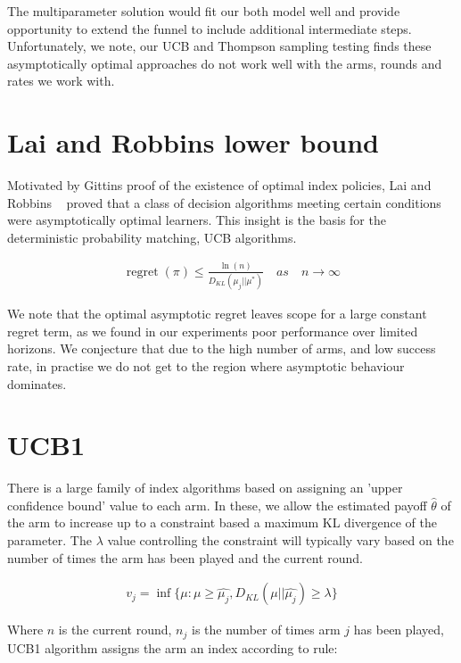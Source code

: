 \documentclass[11pt,a4,singlespacing,titlepagenumber=on]{scrreprt}
\numberwithin{equation}{chapter} %
\theoremstyle{remark}
\begin{document}
The multiparameter solution would fit our both model well and provide opportunity to extend the funnel to include additional intermediate steps. Unfortunately, we note, our UCB and Thompson sampling testing finds these asymptotically optimal approaches do not work well with the arms, rounds and rates we work with.

\section{ Lai and Robbins lower bound }

Motivated by Gittins proof of the existence of optimal index policies, Lai and Robbins ~\cite{lai1985asymptotically} proved that a class of decision algorithms meeting certain conditions were asymptotically optimal learners. This insight is the basis for the deterministic probability matching, UCB algorithms. 

\begin{align}
\operatorname{regret}(\pi)  \leq  \frac{\ln(n)}{D_{KL}(\mu_j||\mu^{*})} \quad as \quad n \to \infty
\end{align}

We note that the optimal asymptotic regret leaves scope for a large constant regret term, as we found in our experiments poor performance over limited horizons. We conjecture that due to the high number of arms, and low success rate, in practise we do not get to the region where asymptotic behaviour dominates.

\section{ UCB1 }

There is a large family of index algorithms based on assigning an 'upper confidence bound' value to each arm. In these, we allow the estimated payoff $\hat{\theta}$ of the arm to increase up to a constraint based a maximum KL divergence of the parameter. The $\lambda$ value controlling the constraint will typically vary based on the number of times the arm has been played and the current round.

\begin{align}
v_j = \inf\{ \mu : \mu \geq \hat{\mu_j}, D_{KL}(\mu||\hat{\mu_j}) \geq \lambda\} 
\end{align}

Where $n$ is the current round, $n_j$ is the number of times arm $j$ has been played, UCB1 algorithm assigns the arm an index according to rule:
\end{document}
